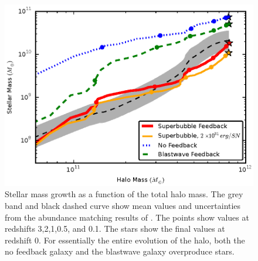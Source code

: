 \begin{figure}
    \includegraphics[width=\textwidth]{figures2/mass_growth.eps}
    \caption[Stellar mass growth for different feedback models]{Stellar mass
    growth as a function of the total halo mass.  The grey band and black dashed
    curve show mean values and uncertainties from the abundance matching results
    of \citet{Behroozi2013}.  The points show values at redshifts 3,2,1,0.5, and
    0.1.  The stars show the final values at redshift 0.  For essentially the
    entire evolution of the halo, both the no feedback galaxy and the blastwave
    galaxy overproduce stars.}
    \label{mass_growth}
\end{figure}
